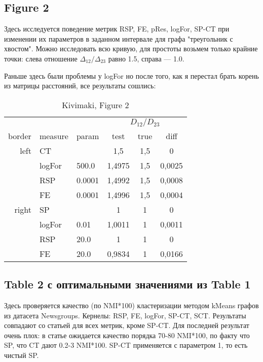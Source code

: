 \documentclass{article}
\begin{document}
\subsection{Figure 2}
Здесь исследуется поведение метрик RSP, FE, pRes, logFor, SP-CT при изменении их параметров в заданном интервале для графа "треугольник с хвостом". Можно исследовать всю кривую, для простоты возьмем только крайние точки: слева отношение $\Delta_{12}/\Delta_{23}$ равно 1.5, справа --- 1.0.

Раньше здесь были проблемы у logFor но после того, как я перестал брать корень из матрицы расстояний, все результаты сошлись:

\begin{table}[H]
\centering
\caption{Kivimaki, Figure 2}
\label{my-label}
\begin{tabular}{rll|cc|c}
      &       &       & \multicolumn{3}{c}{$D_{12} / D_{23}$} \\
border & measure & param & test        & true & diff   \\
      \hline
left  & CT &          & 1,5         & 1,5  & 0      \\
      & logFor & 500.0 & 1,4975      & 1,5  & 0,0025 \\
      & RSP & 0.0001   & 1,4992      & 1,5  & 0,0008 \\
      & FE & 0.0001    & 1,4996      & 1,5  & 0,0004 \\
      \hline
right & SP &          & 1           & 1    & 0      \\
      & logFor & 0.01  & 1,0011      & 1    & 0,0011 \\
      & RSP & 20.0     & 1           & 1    & 0      \\
      & FE & 20.0      & 0,9834      & 1    & 0,0166
\end{tabular}
\end{table}

\subsection{Table 2 с оптимальными значениями из Table 1}
Здесь проверяется качество (по NMI*100) кластеризации методом kMeans графов из датасета Newsgroups. Кернелы: RSP, FE, logFor, SP-CT, SCT. Результаты совпадают со статьей для всех метрик, кроме SP-CT. Для последней результат очень плох: в статье ожидается качество порядка 70-80 NMI*100, по факту что SP, что CT дают 0.2-3 NMI*100. SP-CT применяется с параметром 1, то есть чистый SP.
\end{document}
